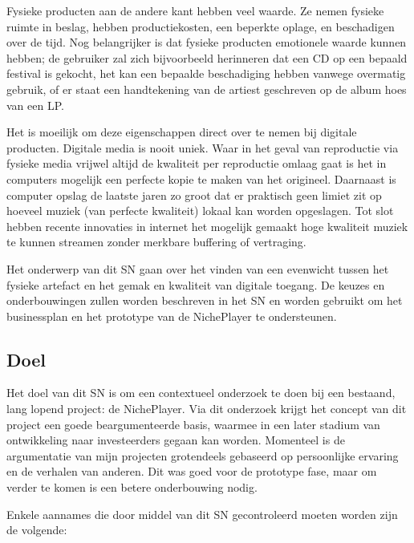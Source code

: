Fysieke producten aan de andere kant hebben veel waarde. Ze nemen fysieke ruimte in beslag, hebben productiekosten, een beperkte oplage, en beschadigen over de tijd. Nog belangrijker is dat fysieke producten emotionele waarde kunnen hebben; de gebruiker zal zich bijvoorbeeld herinneren dat een CD op een bepaald festival is gekocht, het kan een bepaalde beschadiging hebben vanwege overmatig gebruik, of er staat een handtekening van de artiest geschreven op de album hoes van een LP.

Het is moeilijk om deze eigenschappen direct over te nemen bij digitale producten. Digitale media is nooit uniek. Waar in het geval van reproductie via fysieke media vrijwel altijd de kwaliteit per reproductie omlaag gaat is het in computers mogelijk een perfecte kopie te maken van het origineel. Daarnaast is computer opslag de laatste jaren zo groot dat er praktisch geen limiet zit op hoeveel muziek (van perfecte kwaliteit) lokaal kan worden opgeslagen. Tot slot hebben recente innovaties in internet het mogelijk gemaakt hoge kwaliteit muziek te kunnen streamen zonder merkbare buffering of vertraging.

Het onderwerp van dit SN gaan over het vinden van een evenwicht tussen het fysieke artefact en het gemak en kwaliteit van digitale toegang. De keuzes en onderbouwingen zullen worden beschreven in het SN en worden gebruikt om het businessplan en het prototype van de NichePlayer te ondersteunen.

\subsection{Doel}
Het doel van dit SN is om een contextueel onderzoek te doen bij een bestaand, lang lopend project: de NichePlayer.  Via dit onderzoek krijgt het concept van dit project een goede beargumenteerde basis, waarmee in een later stadium van ontwikkeling naar investeerders gegaan kan worden. Momenteel is de argumentatie van mijn projecten grotendeels gebaseerd op persoonlijke ervaring en de verhalen van anderen. Dit was goed voor de prototype fase, maar om verder te komen is een betere onderbouwing nodig.

Enkele aannames die door middel van dit SN gecontroleerd moeten worden zijn de volgende:

